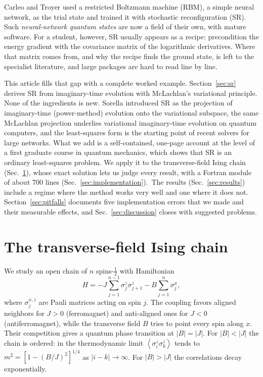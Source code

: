 \documentclass[aps,prb,preprint,amsmath,amssymb,nofootinbib,longbibliography]{revtex4-2}
\newcommand{\ev}[1]{\left\langle #1 \right\rangle}
\begin{document}
Carleo and Troyer\cite{carleo2017} used a restricted Boltzmann machine (RBM), a simple neural network, as the trial
state and trained it with stochastic reconfiguration (SR).\cite{sorella1998,sorella2001} Such \emph{neural-network
quantum states} are now a field of their own,\cite{lange2024} with mature software.\cite{netket2022} For a student,
however, SR usually appears as a recipe: precondition the energy gradient with the covariance matrix of the
logarithmic derivatives. Where that matrix comes from, and why the recipe finds the ground state, is left to the
specialist literature, and large packages are hard to read line by line.

This article fills that gap with a complete worked example. Section~\ref{sec:sr} derives SR from imaginary-time
evolution with McLachlan's variational principle.\cite{mclachlan1964} None of the ingredients is new. Sorella
introduced SR as the projection of imaginary-time (power-method) evolution onto the variational
subspace,\cite{sorella1998,sorella2001,becca2017} the same McLachlan projection underlies variational imaginary-time
evolution on quantum computers,\cite{mcardle2019,yuan2019} and the least-squares form is the starting point of recent
solvers for large networks.\cite{chen2024,rende2024} What we add is a self-contained, one-page account at the level
of a first graduate course in quantum mechanics, which shows that SR is an ordinary least-squares problem. We apply
it to the transverse-field Ising chain (Sec.~\ref{sec:model}), whose exact solution lets us judge every result, with
a Fortran module of about 700 lines (Sec.~\ref{sec:implementation}).\codecite\ The results
(Sec.~\ref{sec:results}) include a regime where the method works very well and one where it does not.
Section~\ref{sec:pitfalls} documents five implementation errors that we made and their measurable effects, and
Sec.~\ref{sec:discussion} closes with suggested problems.

\section{The transverse-field Ising chain}
\label{sec:model}

We study an open chain of $n$ spins-$\frac12$ with Hamiltonian
\begin{equation}
  H = -J \sum_{j=1}^{n-1} \sigma^z_j \sigma^z_{j+1} - B \sum_{j=1}^{n} \sigma^x_j ,
  \label{eq:hamiltonian}
\end{equation}
where $\sigma^{x,z}_j$ are Pauli matrices acting on spin $j$. The coupling favors aligned neighbors for $J > 0$
(ferromagnet) and anti-aligned ones for $J < 0$ (antiferromagnet), while the transverse field $B$ tries to point every
spin along $x$. Their competition gives a quantum phase transition at $|B| = |J|$. For $|B| < |J|$ the chain is
ordered: in the thermodynamic limit $\ev{\sigma^z_i\sigma^z_k}$ tends to $m^2 = [1 - (B/J)^2]^{1/4}$ as $|i - k| \to
\infty$.\cite{pfeuty1970} For $|B| > |J|$ the correlations decay exponentially.
\end{document}
